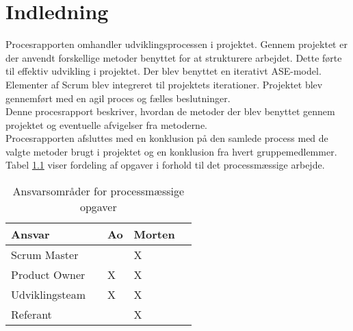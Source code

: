 \chapter{Indledning}
Procesrapporten omhandler udviklingsprocessen i projektet. Gennem projektet er der anvendt
forskellige metoder benyttet for at strukturere arbejdet. Dette førte til effektiv
udvikling i projektet.
Der blev benyttet en iterativt ASE-model. Elementer af Scrum blev integreret til projektets iterationer.
Projektet blev gennemført med en agil proces og fælles beslutninger. \\
Denne procesrapport beskriver, hvordan de metoder der blev benyttet gennem
projektet og eventuelle afvigelser fra metoderne. \\ 
Procesrapporten afsluttes med en konklusion på den samlede process med de valgte metoder brugt i projektet og en konklusion fra hvert gruppemedlemmer. \\
Tabel \ref{ProcessTabel} viser fordeling af opgaver i forhold til det processmæssige arbejde.

\begin{table}[H]
	\centering
	\begin{tabular}{lllll} \hline
		\textbf{Ansvar} &  & \textbf{Ao}&  \textbf{Morten}&  \\ \hline
		Scrum Master&  &  &  X&  \\ \hline
		Product Owner&  &  X&  X& \\ \hline
		Udviklingsteam& & X& X& \\  \hline
		Referant& & & X& \\ \hline
	\end{tabular}
	\caption{Ansvarsområder for processmæssige opgaver}
	\label{ProcessTabel}
\end{table}